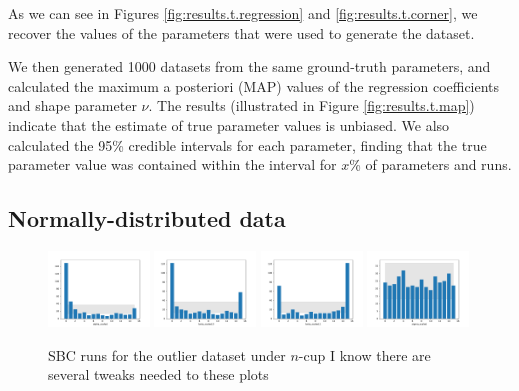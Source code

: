 \documentclass[fleqn,usenatbib]{mnras}
\begin{document}
As we can see in Figures \ref{fig:results.t.regression} and
\ref{fig:results.t.corner}, we recover the values of the parameters that were
used to generate the dataset.

We then generated 1000 datasets from the same ground-truth parameters, and
calculated the maximum a posteriori (MAP) values of the regression coefficients
and shape parameter $\nu$. The results (illustrated in Figure
\ref{fig:results.t.map}) indicate that the estimate of true parameter values is
unbiased.{
\color{red} We also calculated the 95\% credible intervals for each parameter,
finding that the true parameter value was contained within the interval for
$x$\% of parameters and runs.
}


\subsection{Normally-distributed data}
\label{sec:results.outlier}

\begin{figure}
    \includegraphics[width=0.24\textwidth]{graphics/sbc_outlier_ncup/alpha_scaled.pdf}
    \includegraphics[width=0.24\textwidth]{graphics/sbc_outlier_ncup/beta_scaled.0.pdf}
    \includegraphics[width=0.24\textwidth]{graphics/sbc_outlier_ncup/beta_scaled.1.pdf}
    \includegraphics[width=0.24\textwidth]{graphics/sbc_outlier_ncup/sigma_scaled.pdf}
    \caption{SBC runs for the outlier dataset under $n$-cup {\color{red} I know
    there are several tweaks needed to these plots}}
    \label{fig:results.t.sbc}
\end{figure}
\end{document}
